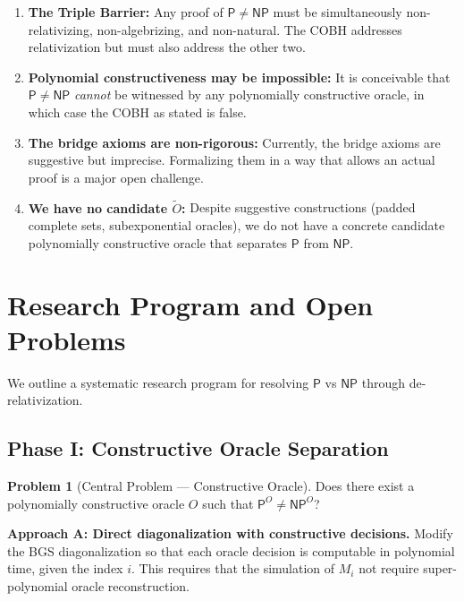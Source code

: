 \documentclass[11pt,a4paper]{article}
\theoremstyle{plain}
\theoremstyle{definition}
\newtheorem{problem}[theorem]{Problem}
\theoremstyle{remark}
\newcommand{\PP}{\mathsf{P}}
\newcommand{\NP}{\mathsf{NP}}
\begin{document}
\begin{enumerate}[label=\textbf{C\arabic*}.]
    \item \textbf{The Triple Barrier:} Any proof of $\PP \neq \NP$ must be
    simultaneously non-relativizing, non-algebrizing, and non-natural.  The
    COBH addresses relativization but must also address the other two.

    \item \textbf{Polynomial constructiveness may be impossible:} It is
    conceivable that $\PP \neq \NP$ \emph{cannot} be witnessed by any
    polynomially constructive oracle, in which case the COBH as stated is false.

    \item \textbf{The bridge axioms are non-rigorous:} Currently, the bridge
    axioms are suggestive but imprecise.  Formalizing them in a way that allows
    an actual proof is a major open challenge.

    \item \textbf{We have no candidate $\widetilde{O}$:} Despite suggestive
    constructions (padded complete sets, subexponential oracles), we do not
    have a concrete candidate polynomially constructive oracle that separates
    $\PP$ from $\NP$.
\end{enumerate}

\section{Research Program and Open Problems}\label{sec:roadmap}

We outline a systematic research program for resolving $\PP$ vs $\NP$ through
de-relativization.

\subsection{Phase I: Constructive Oracle Separation}

\begin{problem}[Central Problem — Constructive Oracle]\label{prob:main}
Does there exist a polynomially constructive oracle $O$ such that
$\PP^O \neq \NP^O$?
\end{problem}

\noindent\textbf{Approach A: Direct diagonalization with constructive decisions.}
Modify the BGS diagonalization so that each oracle decision is computable in
polynomial time, given the index $i$.  This requires that the simulation of
$M_i$ not require super-polynomial oracle reconstruction.
\end{document}
